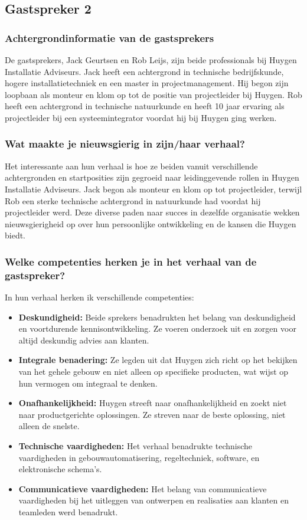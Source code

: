 \subsection{Gastspreker 2}
\subsubsection{Achtergrondinformatie van de gastsprekers}
De gastsprekers, Jack Geurtsen en Rob Leijs, zijn beide professionals bij Huygen Installatie Adviseurs. Jack heeft een achtergrond in technische bedrijfskunde, hogere installatietechniek en een master in projectmanagement. Hij begon zijn loopbaan als monteur en klom op tot de positie van projectleider bij Huygen. Rob heeft een achtergrond in technische natuurkunde en heeft 10 jaar ervaring als projectleider bij een systeemintegrator voordat hij bij Huygen ging werken.
\subsubsection{Wat maakte je nieuwsgierig in zijn/haar verhaal?}
Het interessante aan hun verhaal is hoe ze beiden vanuit verschillende achtergronden en startposities zijn gegroeid naar leidinggevende rollen in Huygen Installatie Adviseurs. Jack begon als monteur en klom op tot projectleider, terwijl Rob een sterke technische achtergrond in natuurkunde had voordat hij projectleider werd. Deze diverse paden naar succes in dezelfde organisatie wekken nieuwsgierigheid op over hun persoonlijke ontwikkeling en de kansen die Huygen biedt.
\subsubsection{Welke competenties herken je in het verhaal van de gastspreker?}
In hun verhaal herken ik verschillende competenties:
\begin{itemize}
    \item \textbf{Deskundigheid:} Beide sprekers benadrukten het belang van deskundigheid en voortdurende kennisontwikkeling. Ze voeren onderzoek uit en zorgen voor altijd deskundig advies aan klanten.
    \item \textbf{Integrale benadering:} Ze legden uit dat Huygen zich richt op het bekijken van het gehele gebouw en niet alleen op specifieke producten, wat wijst op hun vermogen om integraal te denken.
    \item \textbf{Onafhankelijkheid:} Huygen streeft naar onafhankelijkheid en zoekt niet naar productgerichte oplossingen. Ze streven naar de beste oplossing, niet alleen de snelste.
    \item \textbf{Technische vaardigheden:} Het verhaal benadrukte technische vaardigheden in gebouwautomatisering, regeltechniek, software, en elektronische schema's.
    \item \textbf{Communicatieve vaardigheden:} Het belang van communicatieve vaardigheden bij het uitleggen van ontwerpen en realisaties aan klanten en teamleden werd benadrukt.
    
\end{itemize}
